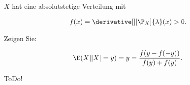 
\begin{exercise}

$X$ hat eine absolutstetige Verteilung mit

\begin{align*}
    f(x)
    =
    \derivative[][\P_X]{\lambda}(x)
    >
    0.
\end{align*}

Zeigen Sie:

\begin{align*}
    \E(X ||X| = y)
    =
    y = \frac{f(y - f(-y))}{f(y) + f(y)}.
\end{align*}

\end{exercise}


\begin{solution}

ToDo!

\end{solution}


